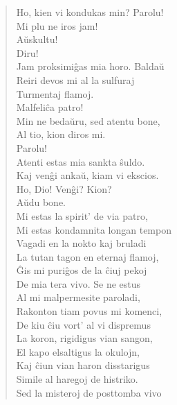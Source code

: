\begin{verse}
 Ho, kien vi kondukas min? Parolu!\\
                Mi plu ne iros jam!\\
 A\u uskultu!\\
 Diru!\\
 Jam proksimi\^gas mia horo. Balda\u u\\
                Reiri devos mi al la sulfuraj\\
                Turmentaj flamoj.\\
 Malfeli\^ca patro!\\
 Min ne beda\u uru, sed atentu bone,\\
                Al tio, kion diros mi.\\
 Parolu!\\
                Atenti estas mia sankta \^suldo.\\
 Kaj ven\^gi anka\u u, kiam vi ekscios.\\
 Ho, Dio! Ven\^gi? Kion?\\
 A\u udu bone.\\
                Mi estas la spirit' de via patro,\\
                Mi estas kondamnita longan tempon\\
                Vagadi en la nokto kaj bruladi\\
                La tutan tagon en eternaj flamoj,\\
                \^Gis mi puri\^gos de la ĉiuj pekoj\\
                De mia tera vivo. Se ne estus\\
                Al mi malpermesite paroladi,\\
                Rakonton tiam povus mi komenci,\\
                De kiu \^ciu vort' al vi dispremus\\
                La koron, rigidigus vian sangon,\\
                El kapo elsaltigus la okulojn,\\
                Kaj \^ciun vian haron disstarigus\\
                Simile al haregoj de histriko.\\
                Sed la misteroj de posttomba vivo\\

\end{verse}
